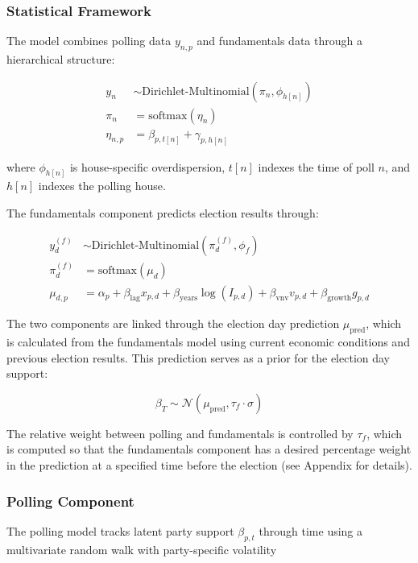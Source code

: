 \documentclass[
  letterpaper,
  DIV=11,
  numbers=noendperiod]{scrartcl}
\begin{document}
\subsubsection{Statistical Framework}\label{statistical-framework}

The model combines polling data \(y_{n,p}\) and fundamentals data
through a hierarchical structure:

\[
\begin{aligned}
y_{n} &\sim \text{Dirichlet-Multinomial}(\pi_{n}, \phi_{h[n]}) \\
\pi_{n} &= \text{softmax}(\eta_{n}) \\
\eta_{n,p} &= \beta_{p,t[n]} + \gamma_{p,h[n]}
\end{aligned}
\]

where \(\phi_{h[n]}\) is house-specific overdispersion, \(t[n]\) indexes
the time of poll \(n\), and \(h[n]\) indexes the polling house.

The fundamentals component predicts election results through:

\[
\begin{aligned}
y^{(f)}_{d} &\sim \text{Dirichlet-Multinomial}(\pi^{(f)}_{d}, \phi_f) \\
\pi^{(f)}_{d} &= \text{softmax}(\mu_{d}) \\
\mu_{d,p} &= \alpha_p + \beta_{\text{lag}}x_{p,d} + \beta_{\text{years}}\log(I_{p,d}) + \beta_{\text{vnv}}v_{p,d} + \beta_{\text{growth}}g_{p,d}
\end{aligned}
\]

The two components are linked through the election day prediction
\(\mu_{\text{pred}}\), which is calculated from the fundamentals model
using current economic conditions and previous election results. This
prediction serves as a prior for the election day support:

\[
\beta_{T} \sim \mathcal{N}(\mu_{\text{pred}}, \tau_f\cdot \sigma)
\]

The relative weight between polling and fundamentals is controlled by
\(\tau_f\), which is computed so that the fundamentals component has a
desired percentage weight in the prediction at a specified time before
the election (see Appendix for details).

\subsubsection{Polling Component}\label{polling-component}

The polling model tracks latent party support \(\beta_{p,t}\) through
time using a multivariate random walk with party-specific volatility
\end{document}
